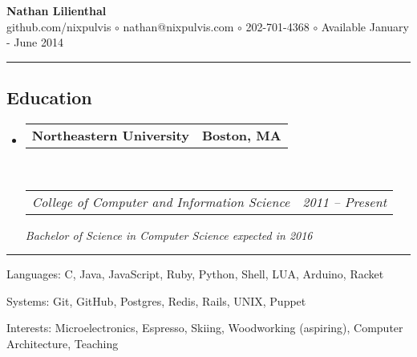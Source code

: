 \documentclass[10pt,letterpaper]{article}
\makeatletter
\newenvironment{indentsection}[1]%
{\begin{list}{}%
  {\setlength{\leftmargin}{#1}}%
  \item[]%
}
{\end{list}}
\newcommand{\headerrow}[2]
{\begin{tabular*}{\linewidth}{l@{\extracolsep{\fill}}r}
  #1 &
  #2 \\
\end{tabular*}}
\makeatother
\begin{document}
\begin{center}
{\huge \textbf{Nathan Lilienthal}}\\\vspace{.2ex}
{\large github.com/nixpulvis $\circ$ nathan@nixpulvis.com $\circ$ 202-701-4368
$\circ$ Available January - June 2014}\vspace{-1ex}
\end{center}

\hrule
\vspace{-0.4em}
\subsection*{Education}

\begin{itemize}
  \parskip=0.1em

  \item 
  \headerrow
    {\textbf{Northeastern University}}
    {\textbf{Boston, MA}}
  \\
  \headerrow
    {\emph{College of Computer and Information Science}}
    {\emph{2011 -- Present}}
    {\emph{Bachelor of Science in Computer Science expected in 2016}}

\end{itemize}


\hrule

\begin{indentsection}{\parindent}
\begin{description*}
  \item[Languages:]
  C, Java, JavaScript, Ruby, Python, Shell, LUA, Arduino, Racket
  \item[Systems:]
  Git, GitHub, Postgres, Redis, Rails, UNIX, Puppet
  \item[Interests:]
  Microelectronics, Espresso, Skiing, Woodworking (aspiring), Computer Architecture, Teaching
\end{description*}
\end{indentsection}
\end{document}
